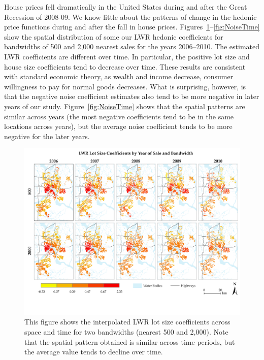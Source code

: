 \documentclass{article}\usepackage{graphicx, color}
\begin{document}
House prices fell dramatically in the United States during and after the Great Recession of 2008-09. We know little about the patterns of change in the hedonic price functions during and after the fall in house prices. Figures~\ref{fig:AcreTime}--\ref{fig:NoiseTime} show the spatial distribution of some our LWR hedonic coefficients for bandwidths of 500 and 2,000 nearest sales for the years 2006--2010.  The estimated LWR coefficients are different over time. In particular, the positive lot size and house size coefficients tend to decrease over time. These results are consistent with standard economic theory, as wealth and income decrease, consumer willingness to pay for normal goods decreases. What is surprising, however, is that the negative noise coefficient estimates also tend to be more negative in later years of our study. Figure~\ref{fig:NoiseTime} shows that the spatial patterns are similar across years (the most negative coefficients tend to be in the same locations across years), but the average noise coefficient tends to be more negative for the later years. 

\begin{figure}
 \includegraphics[trim = 0cm 2cm 0cm 0cm, clip = true, width = \textwidth]{../graphs/Acre_50_200_ByYear}
 \caption{This figure shows the interpolated LWR lot size coefficients across space and time for two bandwidths (nearest 500 and 2,000). Note that the spatial pattern obtained is similar across time periods, but the average value tends to decline over time.}
 \label{fig:AcreTime}
\end{figure}
\end{document}
